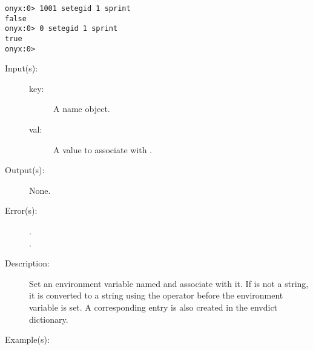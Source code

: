 \begin{description}
\begin{description}
\begin{verbatim}
onyx:0> 1001 setegid 1 sprint
false
onyx:0> 0 setegid 1 sprint
true
onyx:0>
		\end{verbatim}
	\end{description}
\label{systemdict:setenv}
\item[{\onyxop{key val}{setenv}{--}}: ]
	\begin{description}\item[]
	\item[Input(s): ]
		\begin{description}\item[]
		\item[key: ]
			A name object.
		\item[val: ]
			A value to associate with .
		\end{description}
	\item[Output(s): ] None.
	\item[Error(s): ]
		\begin{description}\item[]
		\item[.]
		\item[.]
		\end{description}
	\item[Description: ]
		Set an environment variable named  and associate
		 with it.  If  is not a string, it is
		converted to a string using the
		 operator before the
		environment variable is set.  A corresponding entry is also
		created in the envdict dictionary.
	\item[Example(s): ]\begin{verbatim}


\end{verbatim}
\end{description}
\end{description}
